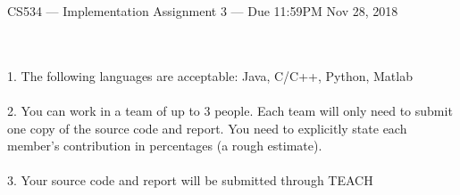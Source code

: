 \documentclass{article}
\begin{document}
{\Large
\begin{center}
CS534 --- Implementation Assignment 3 --- {Due 11:59PM Nov 28, 2018}
\end{center}
}

\\ \\
1. The following languages are acceptable: Java, C/C++, Python, Matlab \\\\
2. You can work in a team of up to 3 people. Each team will only need to submit one copy of the source code and report. You need to explicitly state each member's contribution in percentages (a rough estimate).\\\\
3. Your source code and report will be submitted through TEACH \\\\
\end{document}
